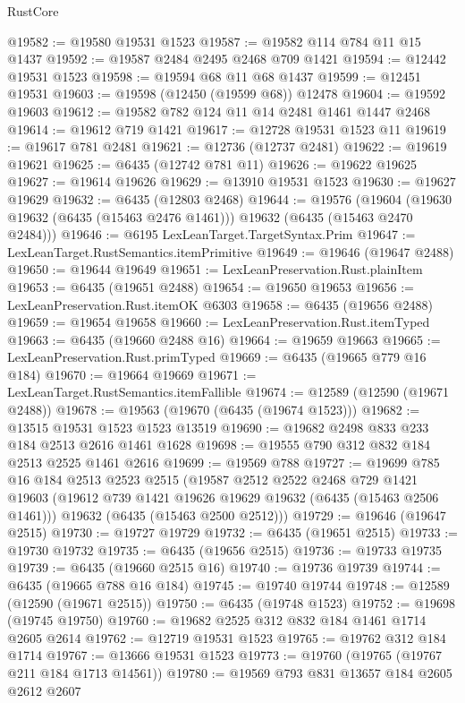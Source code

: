 \begin{lexlean}{RustCore}
\begin{coremodule}
@19582 := @19580 @19531 @1523
@19587 := @19582 @114 @784 @11 @15 @1437
@19592 := @19587 @2484 @2495 @2468 @709 @1421
@19594 := @12442 @19531 @1523
@19598 := @19594 @68 @11 @68 @1437
@19599 := @12451 @19531
@19603 := @19598 (@12450 (@19599 @68)) @12478
@19604 := @19592 @19603
@19612 := @19582 @782 @124 @11 @14 @2481 @1461 @1447 @2468
@19614 := @19612 @719 @1421
@19617 := @12728 @19531 @1523 @11
@19619 := @19617 @781 @2481
@19621 := @12736 (@12737 @2481)
@19622 := @19619 @19621
@19625 := @6435 (@12742 @781 @11)
@19626 := @19622 @19625
@19627 := @19614 @19626
@19629 := @13910 @19531 @1523
@19630 := @19627 @19629
@19632 := @6435 (@12803 @2468)
@19644 := @19576
    (@19604 (@19630 @19632 (@6435 (@15463 @2476 @1461))) @19632 (@6435 (@15463 @2470 @2484)))
@19646 := @6195 LexLeanTarget.TargetSyntax.Prim
@19647 := LexLeanTarget.RustSemantics.itemPrimitive
@19649 := @19646 (@19647 @2488)
@19650 := @19644 @19649
@19651 := LexLeanPreservation.Rust.plainItem
@19653 := @6435 (@19651 @2488)
@19654 := @19650 @19653
@19656 := LexLeanPreservation.Rust.itemOK @6303
@19658 := @6435 (@19656 @2488)
@19659 := @19654 @19658
@19660 := LexLeanPreservation.Rust.itemTyped
@19663 := @6435 (@19660 @2488 @16)
@19664 := @19659 @19663
@19665 := LexLeanPreservation.Rust.primTyped
@19669 := @6435 (@19665 @779 @16 @184)
@19670 := @19664 @19669
@19671 := LexLeanTarget.RustSemantics.itemFallible
@19674 := @12589 (@12590 (@19671 @2488))
@19678 := @19563 (@19670 (@6435 (@19674 @1523)))
@19682 := @13515 @19531 @1523 @1523 @13519
@19690 := @19682 @2498 @833 @233 @184 @2513 @2616 @1461 @1628
@19698 := @19555 @790 @312 @832 @184 @2513 @2525 @1461 @2616
@19699 := @19569 @788
@19727 := @19699
    @785
    @16
    @184
    @2513
    @2523
    @2515
    (@19587
      @2512
      @2522
      @2468
      @729
      @1421
      @19603
      (@19612 @739 @1421 @19626 @19629 @19632 (@6435 (@15463 @2506 @1461)))
      @19632
      (@6435 (@15463 @2500 @2512)))
@19729 := @19646 (@19647 @2515)
@19730 := @19727 @19729
@19732 := @6435 (@19651 @2515)
@19733 := @19730 @19732
@19735 := @6435 (@19656 @2515)
@19736 := @19733 @19735
@19739 := @6435 (@19660 @2515 @16)
@19740 := @19736 @19739
@19744 := @6435 (@19665 @788 @16 @184)
@19745 := @19740 @19744
@19748 := @12589 (@12590 (@19671 @2515))
@19750 := @6435 (@19748 @1523)
@19752 := @19698 (@19745 @19750)
@19760 := @19682 @2525 @312 @832 @184 @1461 @1714 @2605 @2614
@19762 := @12719 @19531 @1523
@19765 := @19762 @312 @184 @1714
@19767 := @13666 @19531 @1523
@19773 := @19760 (@19765 (@19767 @211 @184 @1713 @14561))
@19780 := @19569 @793 @831 @13657 @184 @2605 @2612 @2607

\end{coremodule}
\end{lexlean}
